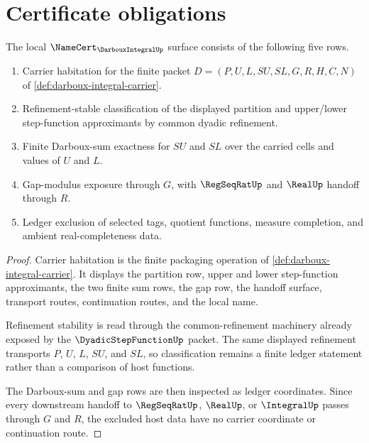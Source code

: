 \section{Certificate obligations}
\label{sec:darboux-integral-obligations}

\begin{theorem}
\label{thm:darboux-integral-namecert-obligations}
The local $\NameCert_{\DarbouxIntegralUp}$ surface consists of the following five rows.
\begin{enumerate}
  \item Carrier habitation for the finite packet $D=(P,U,L,SU,SL,G,R,H,C,N)$ of \autoref{def:darboux-integral-carrier}.
  \item Refinement-stable classification of the displayed partition and upper/lower step-function approximants by common dyadic refinement.
  \item Finite Darboux-sum exactness for $SU$ and $SL$ over the carried cells and values of $U$ and $L$.
  \item Gap-modulus exposure through $G$, with $\RegSeqRatUp$ and $\RealUp$ handoff through $R$.
  \item Ledger exclusion of selected tags, quotient functions, measure completion, and ambient real-completeness data.
\end{enumerate}
\end{theorem}
\begin{proof}
Carrier habitation is the finite packaging operation of \autoref{def:darboux-integral-carrier}. It displays the partition row, upper and lower step-function approximants, the two finite sum rows, the gap row, the handoff surface, transport routes, continuation routes, and the local name.

Refinement stability is read through the common-refinement machinery already exposed by the $\DyadicStepFunctionUp$ packet. The same displayed refinement transports $P$, $U$, $L$, $SU$, and $SL$, so classification remains a finite ledger statement rather than a comparison of host functions.

The Darboux-sum and gap rows are then inspected as ledger coordinates. Since every downstream handoff to $\RegSeqRatUp$, $\RealUp$, or $\IntegralUp$ passes through $G$ and $R$, the excluded host data have no carrier coordinate or continuation route.
\end{proof}

